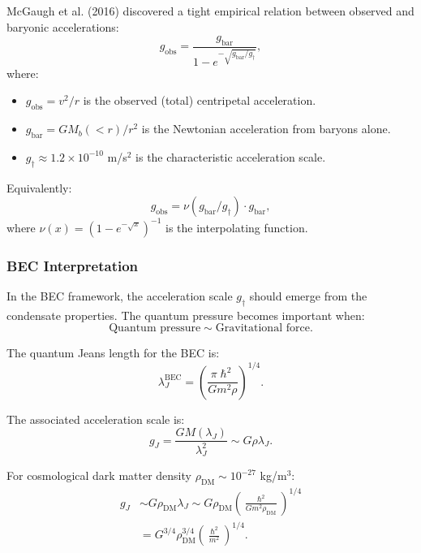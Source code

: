 \documentclass[11pt,a4paper]{article}
\newcommand{\hbar}{\ensuremath{\hslash}}
\newcommand{\gbar}{\ensuremath{g_{\mathrm{bar}}}}
\newcommand{\gobs}{\ensuremath{g_{\mathrm{obs}}}}
\newcommand{\gdagger}{\ensuremath{g_{\dagger}}}
\theoremstyle{definition}
\theoremstyle{remark}
\begin{document}
McGaugh et al. (2016) discovered a tight empirical relation between observed and baryonic accelerations:
\begin{equation}
\label{eq:RAR}
\gobs = \frac{\gbar}{1 - e^{-\sqrt{\gbar/\gdagger}}},
\end{equation}
where:
\begin{itemize}
    \item $\gobs = v^2/r$ is the observed (total) centripetal acceleration.
    \item $\gbar = G M_b(<r)/r^2$ is the Newtonian acceleration from baryons alone.
    \item $\gdagger \approx 1.2 \times 10^{-10}$ m/s$^2$ is the characteristic acceleration scale.
\end{itemize}

Equivalently:
\begin{equation}
\gobs = \nu(\gbar/\gdagger) \cdot \gbar,
\end{equation}
where $\nu(x) = (1 - e^{-\sqrt{x}})^{-1}$ is the interpolating function.

\subsubsection{BEC Interpretation}

In the BEC framework, the acceleration scale $\gdagger$ should emerge from the condensate properties. The quantum pressure becomes important when:
\begin{equation}
\text{Quantum pressure} \sim \text{Gravitational force}.
\end{equation}

The quantum Jeans length for the BEC is:
\begin{equation}
\lambda_J^{\mathrm{BEC}} = \left(\frac{\pi \hbar^2}{G m^2 \rho}\right)^{1/4}.
\end{equation}

The associated acceleration scale is:
\begin{equation}
g_J = \frac{G M(\lambda_J)}{\lambda_J^2} \sim G \rho \lambda_J.
\end{equation}

For cosmological dark matter density $\rho_{\mathrm{DM}} \sim 10^{-27}$ kg/m$^3$:
\begin{align}
g_J &\sim G \rho_{\mathrm{DM}} \lambda_J \sim G \rho_{\mathrm{DM}} \left(\frac{\hbar^2}{G m^2 \rho_{\mathrm{DM}}}\right)^{1/4} \\
&= G^{3/4} \rho_{\mathrm{DM}}^{3/4} \left(\frac{\hbar^2}{m^2}\right)^{1/4}.
\end{align}
\end{document}
